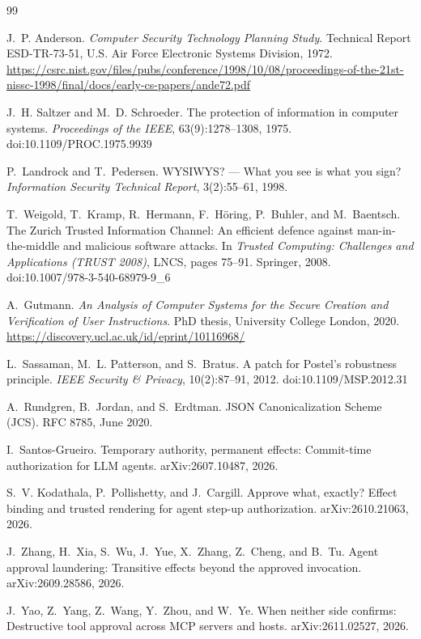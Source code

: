 \documentclass[10pt,twocolumn]{article}
\begin{document}
\begin{thebibliography}{99}
\small
\raggedright
\setlength{\itemsep}{1pt}

 J.~P. Anderson. \emph{Computer Security Technology Planning Study}. Technical Report ESD-TR-73-51, U.S. Air Force Electronic Systems Division, 1972. \url{https://csrc.nist.gov/files/pubs/conference/1998/10/08/proceedings-of-the-21st-nissc-1998/final/docs/early-cs-papers/ande72.pdf}

 J.~H. Saltzer and M.~D. Schroeder. The protection of information in computer systems. \emph{Proceedings of the IEEE}, 63(9):1278--1308, 1975. doi:10.1109/PROC.1975.9939

 P.~Landrock and T.~Pedersen. WYSIWYS? --- What you see is what you sign? \emph{Information Security Technical Report}, 3(2):55--61, 1998.

 T.~Weigold, T.~Kramp, R.~Hermann, F.~H\"oring, P.~Buhler, and M.~Baentsch. The Zurich Trusted Information Channel: An efficient defence against man-in-the-middle and malicious software attacks. In \emph{Trusted Computing: Challenges and Applications (TRUST 2008)}, LNCS, pages 75--91. Springer, 2008. doi:10.1007/978-3-540-68979-9\_6

 A.~Gutmann. \emph{An Analysis of Computer Systems for the Secure Creation and Verification of User Instructions}. PhD thesis, University College London, 2020. \url{https://discovery.ucl.ac.uk/id/eprint/10116968/}

 L.~Sassaman, M.~L. Patterson, and S.~Bratus. A patch for Postel's robustness principle. \emph{IEEE Security \& Privacy}, 10(2):87--91, 2012. doi:10.1109/MSP.2012.31

 A.~Rundgren, B.~Jordan, and S.~Erdtman. JSON Canonicalization Scheme (JCS). RFC 8785, June 2020.

 I.~Santos-Grueiro. Temporary authority, permanent effects: Commit-time authorization for LLM agents. arXiv:2607.10487, 2026.

 S.~V. Kodathala, P.~Pollishetty, and J.~Cargill. Approve what, exactly? Effect binding and trusted rendering for agent step-up authorization. arXiv:2610.21063, 2026.

 J.~Zhang, H.~Xia, S.~Wu, J.~Yue, X.~Zhang, Z.~Cheng, and B.~Tu. Agent approval laundering: Transitive effects beyond the approved invocation. arXiv:2609.28586, 2026.

 J.~Yao, Z.~Yang, Z.~Wang, Y.~Zhou, and W.~Ye. When neither side confirms: Destructive tool approval across MCP servers and hosts. arXiv:2611.02527, 2026.


\end{thebibliography}
\end{document}
